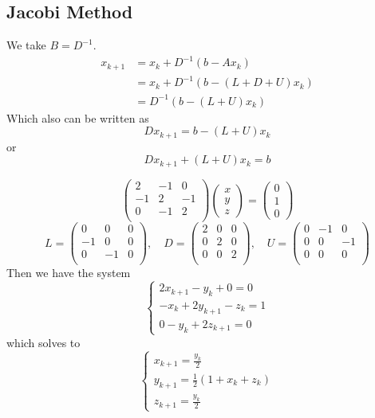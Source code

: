 \documentclass[11pt]{article}
\begin{document}
\subsection{Jacobi Method}
We take $B = D^{-1}$.
\begin{align*}
    x_{k+1} &= x_k + D^{-1}(b-Ax_k) \\
    &= x_k + D^{-1}(b-(L+D+U)x_k) \\
    &= D^{-1}(b-(L+U)x_k)
\end{align*}
Which also can be written as
\[
    Dx_{k+1} = b-(L+U)x_k
\]
or
\[
    Dx_{k+1} + (L+U)x_k = b
\]
\begin{example}
    \[
    \begin{pmatrix}
        2 & -1 & 0\\
        -1 & 2 & -1 \\
        0 & -1 & 2 \\
    \end{pmatrix}
    \begin{pmatrix}
        x\\
        y\\
        z
    \end{pmatrix}=
    \begin{pmatrix}
        0\\
        1\\
        0
    \end{pmatrix}
    \]
    \[
       L= \begin{pmatrix}
            0 & 0 & 0\\
            -1 & 0 & 0\\
            0 & -1 & 0 \\
        \end{pmatrix},\quad
        D = \begin{pmatrix}
            2 & 0 & 0\\
            0 & 2 & 0 \\
            0 & 0 & 2 \\
        \end{pmatrix}, \quad
        U = \begin{pmatrix}
            0 & -1 & 0\\
            0 & 0 & -1 \\
            0 & 0 & 0 \\
        \end{pmatrix}
    \]
    Then we have the system
    \[
        \begin{cases}
            2x_{k+1}-y_k+0 = 0 \\
            -x_k+2y_{k+1}-z_k = 1\\
            0-y_k+2z_{k+1} = 0 
        \end{cases}
    \]
    which solves to
    \[
        \begin{cases}
            x_{k+1} = \frac{y_k}{2}\\
            y_{k+1} = \frac{1}{2}(1+x_k+z_k)\\
            z_{k+1} = \frac{y_k }{2}
        \end{cases}
    \]
\end{example}
\end{document}
